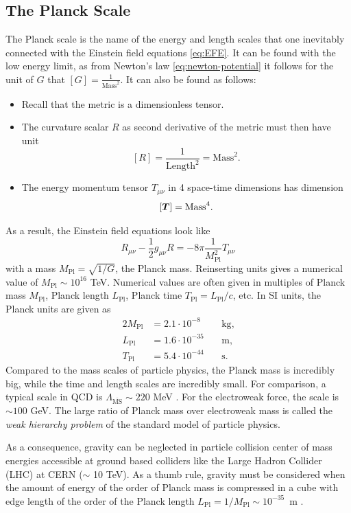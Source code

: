 \documentclass[12pt,a4paper]{report}
\numberwithin{equation}{chapter}
\begin{document}
\subsection{The Planck Scale}\label{sec:planck-scale}
The Planck scale is the name of the energy and length scales that one inevitably connected with the Einstein field equations \eqref{eq:EFE}. It can be found with the low energy limit, as from Newton's law \eqref{eq:newton-potential} it follows for the unit of $G$ that $[G]=\frac{1}{\text{Mass}^2}$. It can also be found as follows:
\begin{itemize}
\item Recall that the metric is a dimensionless tensor.
\item The curvature scalar $R$ as second derivative of the metric must then have unit 
$$ [R] = \frac 1{\text{Length}^2}= \text{Mass}^2. $$
\item The energy momentum tensor $T_{\mu\nu}$ in 4 space-time dimensions has dimension $$[{\boldsymbol{ T }}] = \text{Mass}^ 4.$$
\end{itemize}
As a result, the Einstein field equations look like
\begin{equation}
R_{\mu\nu} - \frac 12 g_{\mu\nu} R = -8\pi \frac{1}{M_\text{Pl}^2} T_{\mu\nu}
\end{equation}
with a mass $M_\text{Pl}=\sqrt{1/G}$, the Planck mass. Reinserting units gives a numerical value of $M_\text{Pl} \sim 10^{16}$ TeV. Numerical values are often given in multiples of Planck mass $M_\text{Pl}$, Planck length $L_\text{Pl}$, Planck time $T_\text{Pl} = L_\text{Pl}/c$, etc. In SI units, the Planck units are given as
\begin{alignat}{2}
M_\text{Pl} &= 2.1 \cdot 10^{-8}~ &&\text{kg}, \\
L_\text{Pl} &= 1.6 \cdot 10^{-35}~ &&\text{m}, \\
T_\text{Pl} &= 5.4 \cdot 10^{-44}~ &&\text{s}.
\end{alignat}
Compared to the mass scales of particle physics, the Planck mass is incredibly big, while the time and length scales are incredibly small. For comparison, a typical scale in QCD is $\Lambda_{\overline{\text{MS}}} \sim 220$ MeV \cite{Antje}. For the electroweak force, the scale is $\sim 100$ GeV. The large ratio of Planck mass over electroweak mass is called the \emph{weak hierarchy problem} of the standard model of particle physics.

As a consequence, gravity can be neglected in particle collision center of mass energies accessible at ground based colliders like the Large Hadron Collider (LHC) at CERN ($\sim$ 10 TeV). As a thumb rule, gravity must be considered when the amount of energy of the order of Planck mass is compressed in a cube with edge length of the order of the Planck length $L_\text{Pl} = 1/M_\text{Pl} \sim 10^{-35}$~m \cite{AdlerSixRoutes}.
\end{document}
